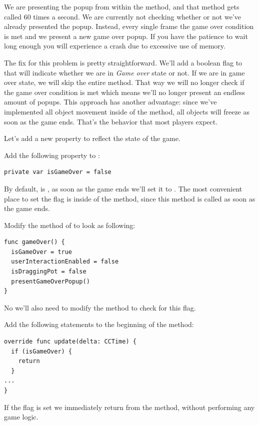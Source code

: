 We are presenting the popup from within the  method, and
that method gets called 60 times a second. We are currently not checking whether
or not we've already presented the popup. Instead, every single frame the game
over condition is met and we present a new game over popup. If you have the
patience to wait long enough you will experience a crash due to excessive use of
memory.

The fix for this problem is pretty straightforward. We'll add a boolean flag to
 that will indicate whether we are in \textit{Game over}
state or not. If we are in game over state, we will skip the entire
 method. That way we will no longer check if the game over
condition is met which means we'll no longer present an endless amount of
popups. This approach has another advantage: since we've implemented all object
movement inside of the  method, all objects will freeze as
soon as the game ends. That's the behavior that most players expect. 

Let's add a new property to reflect the state of the game.

\begin{leftbar}
Add the following property to :
\begin{lstlisting}
private var isGameOver = false
\end{lstlisting}
\end{leftbar}

By default,  is , as soon as the game
ends we'll set it to . The most convenient place to set the
flag is inside of the  method, since this method is called
as soon as the game ends.

\begin{leftbar}
Modify the  method of  to look as
following:
\begin{lstlisting}
func gameOver() {
  isGameOver = true
  userInteractionEnabled = false
  isDraggingPot = false
  presentGameOverPopup()
}
\end{lstlisting}
\end{leftbar}

No we'll also need to modify the  method to check for this
flag.
\begin{leftbar}
Add the following statements to the beginning of the 
method:
\begin{lstlisting}
override func update(delta: CCTime) {
  if (isGameOver) {
    return
  }
...
}
\end{lstlisting}
\end{leftbar}
If the  flag is set we immediately return from the
 method, without performing any game logic.

